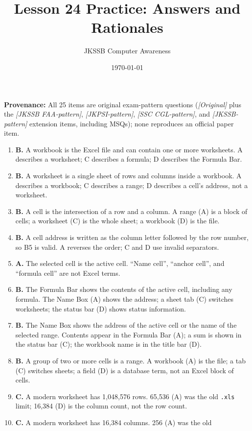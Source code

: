\documentclass[11pt]{article}
\title{Lesson 24 Practice: Answers and Rationales}
\author{JKSSB Computer Awareness}
\date{\today}
\begin{document}
\maketitle
\noindent\textbf{Provenance:} All 25 items are original exam-pattern questions (\textit{[Original]} plus the \textit{[JKSSB FAA-pattern]}, \textit{[JKPSI-pattern]}, \textit{[SSC CGL-pattern]}, and \textit{[JKSSB-pattern]} extension items, including MSQs); none reproduces an official paper item.
\begin{enumerate}[label=\textbf{Q\arabic*.}, leftmargin=*]
\item \textbf{B.} A workbook is the Excel file and can contain one or more
  worksheets. A describes a worksheet; C describes a formula; D describes the
  Formula Bar.
\item \textbf{B.} A worksheet is a single sheet of rows and columns inside a
  workbook. A describes a workbook; C describes a range; D describes a cell's
  address, not a worksheet.
\item \textbf{B.} A cell is the intersection of a row and a column. A range
  (A) is a block of cells; a worksheet (C) is the whole sheet; a workbook (D)
  is the file.
\item \textbf{B.} A cell address is written as the column letter followed by
  the row number, so B5 is valid. A reverses the order; C and D use invalid
  separators.
\item \textbf{A.} The selected cell is the active cell. ``Name cell'', ``anchor
  cell'', and ``formula cell'' are not Excel terms.
\item \textbf{B.} The Formula Bar shows the contents of the active cell,
  including any formula. The Name Box (A) shows the address; a sheet tab (C)
  switches worksheets; the status bar (D) shows status information.
\item \textbf{B.} The Name Box shows the address of the active cell or the
  name of the selected range. Contents appear in the Formula Bar (A); a sum
  is shown in the status bar (C); the workbook name is in the title bar (D).
\item \textbf{B.} A group of two or more cells is a range. A workbook (A) is
  the file; a tab (C) switches sheets; a field (D) is a database term, not an
  Excel block of cells.
\item \textbf{C.} A modern worksheet has 1,048,576 rows. 65,536 (A) was the
  old \texttt{.xls} limit; 16,384 (D) is the column count, not the row count.
\item \textbf{C.} A modern worksheet has 16,384 columns. 256 (A) was the old

\end{enumerate}
\end{document}
